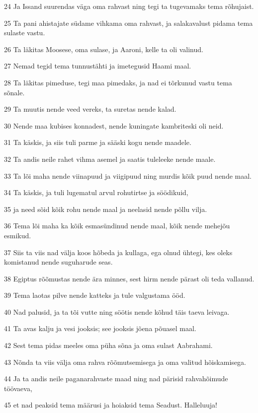 \par 24 Ja Issand suurendas väga oma rahvast ning tegi ta tugevamaks tema rõhujaist.
\par 25 Ta pani ahistajate südame vihkama oma rahvast, ja salakavalust pidama tema sulaste vastu.
\par 26 Ta läkitas Moosese, oma sulase, ja Aaroni, kelle ta oli valinud.
\par 27 Nemad tegid tema tunnustähti ja imetegusid Haami maal.
\par 28 Ta läkitas pimeduse, tegi maa pimedaks, ja nad ei tõrkunud vastu tema sõnale.
\par 29 Ta muutis nende veed vereks, ta suretas nende kalad.
\par 30 Nende maa kubises konnadest, nende kuningate kambriteski oli neid.
\par 31 Ta käskis, ja siis tuli parme ja sääski kogu nende maadele.
\par 32 Ta andis neile rahet vihma asemel ja saatis tuleleeke nende maale.
\par 33 Ta lõi maha nende viinapuud ja viigipuud ning murdis kõik puud nende maal.
\par 34 Ta käskis, ja tuli lugematul arvul rohutirtse ja söödikuid,
\par 35 ja need sõid kõik rohu nende maal ja neelasid nende põllu vilja.
\par 36 Tema lõi maha ka kõik esmasündinud nende maal, kõik nende mehejõu esmikud.
\par 37 Siis ta viis nad välja koos hõbeda ja kullaga, ega olnud ühtegi, kes oleks komistanud nende suguharude seas.
\par 38 Egiptus rõõmustas nende ära minnes, sest hirm nende pärast oli teda vallanud.
\par 39 Tema laotas pilve nende katteks ja tule valgustama ööd.
\par 40 Nad palusid, ja ta tõi vutte ning söötis nende kõhud täis taeva leivaga.
\par 41 Ta avas kalju ja vesi jooksis; see jooksis jõena põuasel maal.
\par 42 Sest tema pidas meeles oma püha sõna ja oma sulast Aabrahami.
\par 43 Nõnda ta viis välja oma rahva rõõmutsemisega ja oma valitud hõiskamisega.
\par 44 Ja ta andis neile paganarahvaste maad ning nad pärisid rahvahõimude töövaeva,
\par 45 et nad peaksid tema määrusi ja hoiaksid tema Seadust. Halleluuja!

